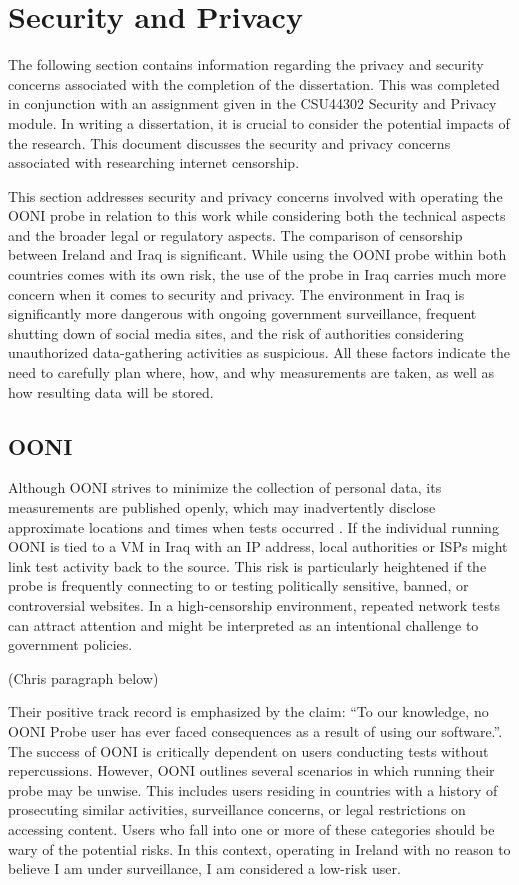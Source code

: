 \chapter{Security and Privacy}

The following section contains information regarding the privacy and security
concerns associated with the completion of the dissertation. This was completed in conjunction with an assignment given in the CSU44302 Security and Privacy module. In writing a dissertation, it is crucial to consider the potential impacts of the research. This document discusses the security and privacy concerns associated with researching internet censorship.

This section addresses security and privacy concerns involved with operating the OONI probe in relation to this work while considering both the technical aspects and the broader legal or regulatory aspects. The comparison of censorship between Ireland and Iraq is significant. While using the OONI probe within both countries comes with its own risk, the use of the probe in Iraq carries much more concern when it comes to security and privacy. The environment in Iraq is significantly more dangerous with ongoing government surveillance, frequent shutting down of social media sites, and the risk of authorities considering unauthorized data-gathering activities as suspicious. All these factors indicate the need to carefully plan where, how, and why measurements are taken, as well as how resulting data will be stored.

\section{OONI}

Although OONI strives to minimize the collection of personal data, its measurements are published openly, which may inadvertently disclose approximate locations and times when tests occurred \cite{ooniOONIPrivacyAndSecurity}. If the individual running OONI is tied to a VM in Iraq with an IP address, local authorities or ISPs might link test activity back to the source. This risk is particularly heightened if the probe is frequently connecting to or testing politically sensitive, banned, or controversial websites. In a high-censorship environment, repeated network tests can attract attention and might be interpreted as an intentional challenge to government policies.

(Chris paragraph below)

Their positive track record is emphasized by the claim: “To our knowledge, no OONI Probe user has ever faced consequences as a result of using our software.”\cite{OONIRisks}. The success of OONI is critically dependent on users conducting tests without repercussions. However, OONI outlines several scenarios in which running their probe may be unwise. This includes users residing in countries with a history of prosecuting similar activities, surveillance concerns, or legal restrictions on accessing content. Users who fall into one or more of these categories should be wary of the potential
risks. In this context, operating in Ireland with no reason to believe I am under surveillance, I am considered a low-risk user.

